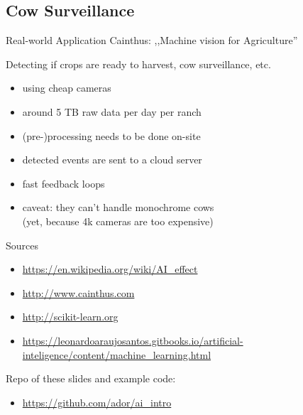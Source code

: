 \documentclass[15pt]{beamer}
\begin{document}
\subsection{Cow Surveillance}


\begin{frame}{Real-world Application}
    \alert{Cainthus: ,,Machine vision for Agriculture''}

    \vspace{2mm}
    Detecting if crops are ready to harvest, cow surveillance, etc.
    \vspace{2mm}

    \begin{itemize}
        \item using cheap cameras
        \item around 5 TB raw data per day per ranch
        \item (pre-)processing needs to be done on-site
        \item detected events are sent to a cloud server
        \item fast feedback loops
        \item caveat: they can't handle monochrome cows \\\scriptsize{(yet, because 4k cameras are too expensive)}
    \end{itemize}
\end{frame}


\begin{frame}{Sources}
    \small
    \begin{itemize}
        \item \url{https://en.wikipedia.org/wiki/AI_effect}
        \item \url{http://www.cainthus.com}
        \item \url{http://scikit-learn.org}
        \item \url{https://leonardoaraujosantos.gitbooks.io/artificial-inteligence/content/machine_learning.html}
    \end{itemize}

    Repo of these slides and example code:

    \begin{itemize}
        \item \url{https://github.com/ador/ai_intro}
    \end{itemize}
\end{frame}
\end{document}
